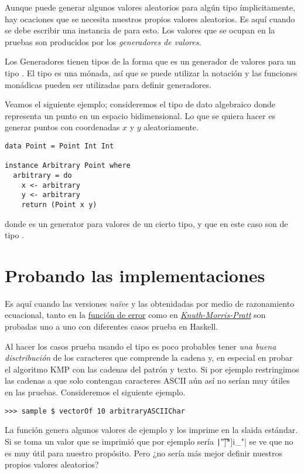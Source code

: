 Aunque \QuickCheck puede generar algunos valores aleatorios para algún tipo ímplicitamente, hay
ocaciones que se necesita nuestros propios valores aleatorios. Es aquí cuando se debe escribir
una instancia de  para esto. Los valores que se ocupan en la pruebas son
producidos por los \textit{generadores de valores}.

Los Generadores tienen tipos de la forma  que es un generador de valores para
un tipo . El tipo  es una mónada, así que se puede utilizar la notación 
 y las funciones monádicas pueden ser utilizadas para definir generadores.

Veamos el siguiente ejemplo; consideremos el tipo de dato algebraico  donde
representa un punto en un espacio bidimensional. Lo que se quiera hacer es generar puntos
con coordenadas $x$ y $y$ aleatoriamente.

\begin{verbatim}
data Point = Point Int Int

instance Arbitrary Point where
  arbitrary = do
    x <- arbitrary
    y <- arbitrary
    return (Point x y)
\end{verbatim}

donde  es un generator para valores de un cierto tipo, y que en este
caso son de tipo .

\section{Probando las implementaciones}

Es aquí cuando las versiones \emph{naïve} y las obtenidadas por medio de razonamiento ecuacional,
tanto en la \hyperlink{funcional:funcion_error}{función de error} como en
\hyperlink{funcional:kmp}{\textit{Knuth-Morris-Pratt}} son probadas uno a uno con diferentes casos
prueba en Haskell.

Al hacer los casos prueba usando el tipo  es poco probables tener
\textit{una buena disctribución} de los caracteres que comprende la cadena y, en especial en probar
el algoritmo KMP con las cadenas del patrón y texto. Si por ejemplo restringimos las cadenas
a que solo contengan caracteres ASCII aún así no serían muy útiles en las pruebas. Consideremos
el siguiente ejemplo.

\begin{verbatim}
>>> sample $ vectorOf 10 arbitraryASCIIChar
\end{verbatim}
La función  genera algunos valores de ejemplo y los
imprime en la slaida estándar. Si se toma un valor que se imprimió que por ejemplo sería
\texttt|"\t\n]*]i_\fm\SYN"| se ve que no es muy útil para nuestro propósito. Pero
¿no sería más mejor definir nuestros propios valores aleatorios?

